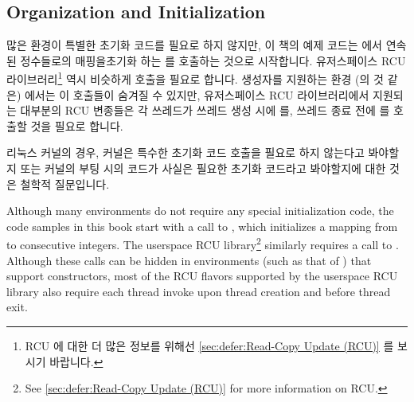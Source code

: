 \subsection{Organization and Initialization}
\label{sec:toolsoftrade:Organization and Initialization}

많은 환경이 특별한 초기화 코드를 필요로 하지 않지만, 이 책의 예제 코드는
 에서 연속된 정수들로의 매핑을초기화 하는 
를 호출하는 것으로 시작합니다.
유저스페이스 RCU 라이브러리\footnote{
	RCU 에 대한 더 많은 정보를 위해선
	\cref{sec:defer:Read-Copy Update (RCU)} 를 보시기 바랍니다.}
역시 비슷하게  호출을 필요로 합니다.
생성자를 지원하는 환경 (\GCC 의 것 같은) 에서는 이 호출들이 숨겨질 수 있지만,
유저스페이스 RCU 라이브러리에서 지원되는 대부분의 RCU 변종들은 각 쓰레드가
쓰레드 생성 시에  를, 쓰레드 종료 전에
 를 호출할 것을 필요로 합니다.

리눅스 커널의 경우, 커널은 특수한 초기화 코드 호출을 필요로 하지 않는다고
봐야할지 또는 커널의 부팅 시의 코드가 사실은 필요한 초기화 코드라고 봐야할지에
대한 것은 철학적 질문입니다.

\iffalse

Although many environments do not require any special initialization
code, the code samples in this book start with a call to ,
which initializes a mapping from  to consecutive integers.
The userspace RCU library\footnote{
	See \cref{sec:defer:Read-Copy Update (RCU)} for more information
	on RCU\@.}
similarly requires a call to .
Although these calls can be hidden in environments (such as that of
\GCC) that support constructors,
most of the RCU flavors supported by the userspace RCU library
also require each thread invoke  upon thread
creation and  before thread exit.

